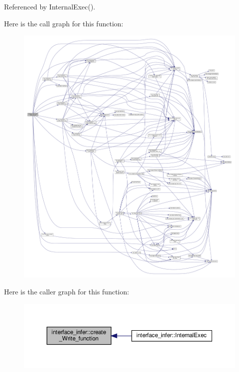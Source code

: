 Referenced by Internal\+Exec().

Here is the call graph for this function\+:
\nopagebreak
\begin{figure}[H]
\begin{center}
\leavevmode
\includegraphics[width=350pt]{d9/d8a/classinterface__infer_a7a20911ad7bad6cbb4afee947f26131e_cgraph}
\end{center}
\end{figure}
Here is the caller graph for this function\+:
\nopagebreak
\begin{figure}[H]
\begin{center}
\leavevmode
\includegraphics[width=350pt]{d9/d8a/classinterface__infer_a7a20911ad7bad6cbb4afee947f26131e_icgraph}
\end{center}
\end{figure}
\mbox{\label{classinterface__infer_ad97e5d56a1e05d81ed97976e8e8382f7}} 
